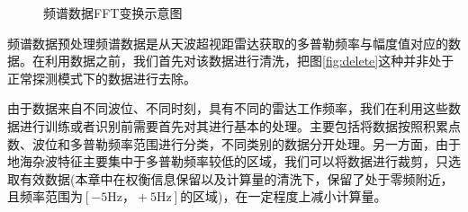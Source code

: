 \begin{figure}[H]
	\centering
	\hfil

	\caption{频谱数据FFT变换示意图}
	\label{fig:fft}
\end{figure}

频谱数据预处理频谱数据是从天波超视距雷达获取的多普勒频率与幅度值对应的数据。在利用数据之前，我们首先对该数据进行清洗，把图\ref{fig:delete}这种并非处于正常探测模式下的数据进行去除。 

由于数据来自不同波位、不同时刻，具有不同的雷达工作频率，我们在利用这些数据进行训练或者识别前需要首先对其进行基本的处理。主要包括将数据按照积累点数、波位和多普勒频率范围进行分类，不同类别的数据分开处理。另一方面，由于地海杂波特征主要集中于多普勒频率较低的区域，我们可以将数据进行裁剪，只选取有效数据(本章中在权衡信息保留以及计算量的清洗下，保留了处于零频附近，且频率范围为$[-5\text{Hz}，+5\text{Hz}]$的区域)，在一定程度上减小计算量。 



